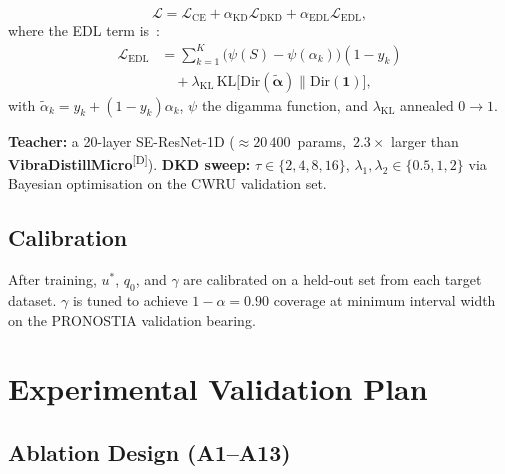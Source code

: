 \documentclass[conference]{IEEEtran}
\newcommand{\evD}{\textsuperscript{\textcolor{derived}{[D]}}\xspace}
\newcommand{\VDM}{\textsf{\textbf{VibraDistillMicro}}\xspace}
\begin{document}
\begin{equation}
  \mathcal{L}
    = \mathcal{L}_\mathrm{CE}
    + \alpha_\mathrm{KD}\mathcal{L}_\mathrm{DKD}
    + \alpha_\mathrm{EDL}\mathcal{L}_\mathrm{EDL},
  \label{eq:loss}
\end{equation}
where the EDL term is~\cite{sensoy2018evidential}:
\begin{align}
  \mathcal{L}_\mathrm{EDL}
    &= \sum_{k=1}^K\!\bigl(\psi(S)-\psi(\alpha_k)\bigr)(1-y_k) \nonumber\\
    &\quad + \lambda_\mathrm{KL}\,
      \mathrm{KL}\!\bigl[\mathrm{Dir}(\tilde{\bm{\alpha}})
      \|\mathrm{Dir}(\mathbf{1})\bigr],
  \label{eq:edl_loss}
\end{align}
with $\tilde{\alpha}_k=y_k+(1-y_k)\alpha_k$, $\psi$ the digamma
function, and $\lambda_\mathrm{KL}$ annealed $0\!\to\!1$.

\textbf{Teacher:} a 20-layer SE-ResNet-1D
(${\approx}20\,400$~params,~$2.3{\times}$ larger than \VDM\evD).
\textbf{DKD sweep:} $\tau\in\{2,4,8,16\}$,
$\lambda_1,\lambda_2\in\{0.5,1,2\}$ via Bayesian optimisation on
the CWRU validation set.

\subsection{Calibration}

After training, $u^*$, $q_0$, and $\gamma$ are calibrated on a
held-out set from each target dataset.
$\gamma$ is tuned to achieve $1-\alpha=0.90$ coverage at minimum
interval width on the PRONOSTIA validation bearing.

\section{Experimental Validation Plan}
\label{sec:exp}

\subsection{Ablation Design (A1--A13)}
\end{document}
